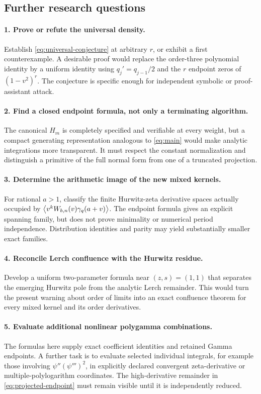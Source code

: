 \subsection{Further research questions}
\paragraph{1. Prove or refute the universal density.}
Establish \eqref{eq:universal-conjecture} at arbitrary $r$, or exhibit a
first counterexample. A desirable proof would replace the order-three
polynomial identity by a uniform identity using $q_j'=q_{j-1}/2$ and the
$r$ endpoint zeros of $(1-v^2)^r$. The conjecture is specific enough for
independent symbolic or proof-assistant attack.

\paragraph{2. Find a closed endpoint formula, not only a terminating algorithm.}
The canonical $H_m$ is completely specified and verifiable at every
weight, but a compact generating representation analogous to
\eqref{eq:main} would make analytic integrations more transparent. It must
respect the constant normalization and distinguish a primitive of the
full normal form from one of a truncated projection.

\paragraph{3. Determine the arithmetic image of the new mixed kernels.}
For rational $a>1$, classify the finite Hurwitz-zeta derivative spaces
actually occupied by $\left\langle v^kW_{b,n}(v)\gamma_q(a+v)\right\rangle$. The endpoint
formula gives an explicit spanning family, but does not prove minimality
or numerical period independence. Distribution identities and parity may
yield substantially smaller exact families.

\paragraph{4. Reconcile Lerch confluence with the Hurwitz residue.}
Develop a uniform two-parameter formula near $(z,s)=(1,1)$ that separates
the emerging Hurwitz pole from the analytic Lerch remainder. This would
turn the present warning about order of limits into an exact confluence
theorem for every mixed kernel and its order derivatives.

\paragraph{5. Evaluate additional nonlinear polygamma combinations.}
The formulas here supply exact coefficient identities and retained
Gamma endpoints. A further task is to evaluate selected individual
integrals, for example those involving $\psi''(\psi''')^2$, in explicitly
declared convergent zeta-derivative or multiple-polylogarithm coordinates.
The high-derivative remainder in \eqref{eq:projected-endpoint} must remain
visible until it is independently reduced.

